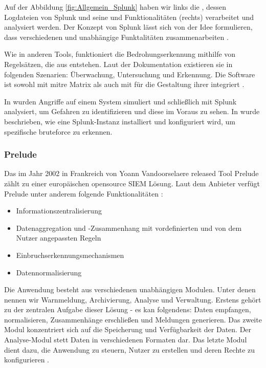 Auf der Abbildung \ref{fig:Allgemein_Splunk} haben wir links die , dessen Logdateien von Splunk und seine  und Funktionalitäten (rechts) verarbeitet und analysiert werden. Der Konzept von Splunk lässt sich von der Idee formulieren, dass verschiedenen und unabhängige Funktalitäten zusammenarbeiten \citep{Splunk_platform}.

\newpage
Wie in anderen Tools, funktioniert die Bedrohungserkennung mithilfe von Regelsätzen, die aus  entstehen. Laut der Dokumentation existieren sie in folgenden Szenarien: Überwachung, Untersuchung und Erkennung. Die Software ist sowohl mit \gls{mitre} Matrix als auch mit  für die Gestaltung ihrer  integriert \citep{Splunk_usecases}.

In \citep{Su_SplunkDDOS} wurden Angriffe auf einem System simuliert und schließlich mit Splunk analysiert, um Gefahren zu identifizieren und diese im Voraus zu sehen. In \citep{Selvaganesh_SplunkBruteForce} wurde beschrieben, wie eine Splunk-Instanz installiert und konfiguriert wird, um spezifische \gls{bruteforce} zu erkennen.

\subsubsection{Prelude}
Das im Jahr 2002 in Frankreich von Yoann Vandoorselaere released Tool Prelude zählt zu einer europäischen \gls{opensource} \gls{SIEM} Lösung. Laut dem Anbieter verfügt Prelude unter anderem folgende Funktionalitäten \citep{Prelude_SIEM}:

\begin{itemize}[noitemsep]
   \item	Informationszentralisierung
   \item	Datenaggregation und -Zusammenhang mit vordefinierten und von dem Nutzer angepassten Regeln
   \item	Einbruchserkennungsmechanismen
   \item	Datennormalisierung
\end{itemize}

Die Anwendung besteht aus verschiedenen unabhängigen Modulen. Unter denen nennen wir Warnmeldung, Archivierung, Analyse und Verwaltung. Erstens gehört zu der zentralen Aufgabe dieser Lösung - es kan folgendens: Daten empfangen, normalisieren, Zusammenhänge erschließen und Meldungen generieren. Das zweite Modul  konzentriert sich auf die Speicherung und Verfügbarkeit der Daten. Der Analyse-Modul stett Daten in verschiedenen Formaten dar. Das letzte Modul dient dazu, die Anwendung zu steuern, Nutzer zu erstellen und deren Rechte zu konfigurieren \citep{EC_Prelude}.

